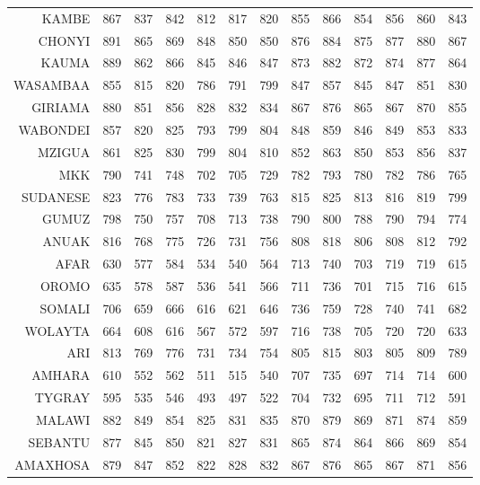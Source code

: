 \begin{longtable}{rrrrrrrrrrrrr}
  KAMBE & 867 & 837 & 842 & 812 & 817 & 820 & 855 & 866 & 854 & 856 & 860 & 843 \\ 
  CHONYI & 891 & 865 & 869 & 848 & 850 & 850 & 876 & 884 & 875 & 877 & 880 & 867 \\ 
  KAUMA & 889 & 862 & 866 & 845 & 846 & 847 & 873 & 882 & 872 & 874 & 877 & 864 \\ 
  WASAMBAA & 855 & 815 & 820 & 786 & 791 & 799 & 847 & 857 & 845 & 847 & 851 & 830 \\ 
  GIRIAMA & 880 & 851 & 856 & 828 & 832 & 834 & 867 & 876 & 865 & 867 & 870 & 855 \\ 
  WABONDEI & 857 & 820 & 825 & 793 & 799 & 804 & 848 & 859 & 846 & 849 & 853 & 833 \\ 
  MZIGUA & 861 & 825 & 830 & 799 & 804 & 810 & 852 & 863 & 850 & 853 & 856 & 837 \\ 
   \hline 
MKK & 790 & 741 & 748 & 702 & 705 & 729 & 782 & 793 & 780 & 782 & 786 & 765 \\ 
  SUDANESE & 823 & 776 & 783 & 733 & 739 & 763 & 815 & 825 & 813 & 816 & 819 & 799 \\ 
  GUMUZ & 798 & 750 & 757 & 708 & 713 & 738 & 790 & 800 & 788 & 790 & 794 & 774 \\ 
  ANUAK & 816 & 768 & 775 & 726 & 731 & 756 & 808 & 818 & 806 & 808 & 812 & 792 \\ 
   \hline 
AFAR & 630 & 577 & 584 & 534 & 540 & 564 & 713 & 740 & 703 & 719 & 719 & 615 \\ 
  OROMO & 635 & 578 & 587 & 536 & 541 & 566 & 711 & 736 & 701 & 715 & 716 & 615 \\ 
  SOMALI & 706 & 659 & 666 & 616 & 621 & 646 & 736 & 759 & 728 & 740 & 741 & 682 \\ 
  WOLAYTA & 664 & 608 & 616 & 567 & 572 & 597 & 716 & 738 & 705 & 720 & 720 & 633 \\ 
  ARI & 813 & 769 & 776 & 731 & 734 & 754 & 805 & 815 & 803 & 805 & 809 & 789 \\ 
  AMHARA & 610 & 552 & 562 & 511 & 515 & 540 & 707 & 735 & 697 & 714 & 714 & 600 \\ 
  TYGRAY & 595 & 535 & 546 & 493 & 497 & 522 & 704 & 732 & 695 & 711 & 712 & 591 \\ 
   \hline 
MALAWI & 882 & 849 & 854 & 825 & 831 & 835 & 870 & 879 & 869 & 871 & 874 & 859 \\ 
  SEBANTU & 877 & 845 & 850 & 821 & 827 & 831 & 865 & 874 & 864 & 866 & 869 & 854 \\ 
  AMAXHOSA & 879 & 847 & 852 & 822 & 828 & 832 & 867 & 876 & 865 & 867 & 871 & 856 \\ 

\end{longtable}
